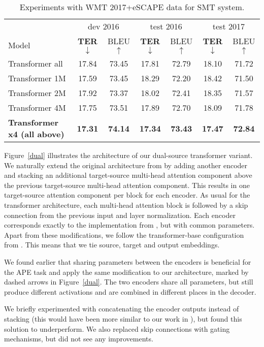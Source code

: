 \documentclass[11pt,a4paper]{article}
\begin{document}
\begin{table*}[t]
\centering
\begin{tabular}{p{5.5cm}cccccc}
\toprule
& \multicolumn{2}{c}{dev 2016} & \multicolumn{2}{c}{test 2016} & \multicolumn{2}{c}{test 2017}\\
Model & \textbf{TER$\downarrow$} & BLEU$\uparrow$ & \textbf{TER$\downarrow$} & BLEU$\uparrow$ & \textbf{TER$\downarrow$} & BLEU$\uparrow$ \\
\midrule
Transformer all & 17.84 & 73.45 & 17.81 & 72.79 & 18.10 & 71.72 \\ 
Transformer 1M & 17.59 & 73.45 & 18.29 & 72.20 & 18.42 & 71.50 \\ 
Transformer 2M & 17.92 & 73.37 & 18.02 & 72.41 & 18.35 & 71.57\\ 
Transformer 4M & 17.75 & 73.51 & 17.89 & 72.70 & 18.09 & 71.78 \\ \midrule
\bf Transformer x4 (all above) & \bf 17.31 & \bf 74.14 & \bf 17.34 & \bf 73.43 & \bf 17.47 & \bf 72.84 \\ 

\bottomrule
\end{tabular}
\caption{Experiments with WMT 2017+eSCAPE data for SMT system.}\label{tab:results2}
\end{table*}

Figure~\ref{dual} illustrates the architecture of our dual-source transformer variant. We naturally extend the original architecture from  by adding another encoder and stacking an additional target-source multi-head attention component above the previous target-source multi-head attention component. This results in one target-source attention component per block for each encoder. As usual for the transformer architecture, each multi-head attention block is followed by a skip connection from the previous input and layer normalization. Each encoder corresponds exactly to the implementation from , but with common parameters. Apart from these modifications, we follow the transformer-base configuration from . This means that we tie source, target and output embeddings. 

We found earlier that sharing parameters between the encoders is beneficial for the APE task and apply the same modification to our architecture, marked by dashed arrows in Figure~\ref{dual}. The two encoders share all parameters, but still produce different activations and are combined in different places in the decoder. 

We briefly experimented with concatenating the encoder outputs instead of stacking (this would have been more similar to our work in ), but found this solution to underperform. We also replaced skip connections with gating mechanisms, but did not see any improvements.
\end{document}
